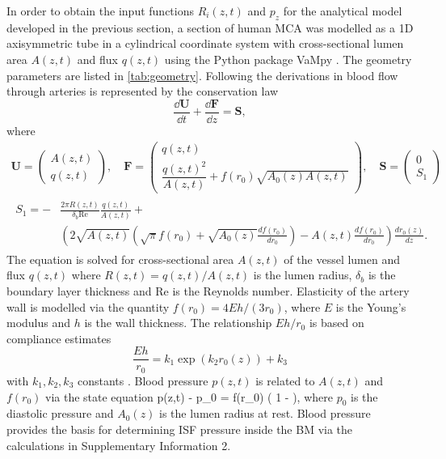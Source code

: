 \documentclass[a4paper,titlepage]{scrartcl}
\begin{document}
In order to obtain the input functions $R_i(z,t)$ and $p_z$ for the analytical model developed in the previous section, a section of human MCA was modelled as a 1D axisymmetric tube in a cylindrical coordinate system with cross-sectional lumen area $A(z,t)$ and flux $q(z,t)$ using the Python package VaMpy \cite{Diem2016a}. The geometry parameters are listed in \autoref{tab:geometry}. Following the derivations in \cite{Olufsen2000,Diem2016} blood flow through arteries is represented by the conservation law
\begin{equation}
  \frac{\dd \boldsymbol{U}}{\dd t} + \frac{\dd \boldsymbol{F}}{\dd z} = \boldsymbol{S}, \label{eq:conservation}
\end{equation}
where
\begin{gather*}
  \boldsymbol{U} = \begin{pmatrix} A(z,t) \\ q(z,t) \end{pmatrix}, \quad \boldsymbol{F} = \begin{pmatrix} q(z,t)\\ \dfrac{q(z,t)^2}{A(z,t)} + f(r_0) \sqrt{A_0(z) A(z,t)} \end{pmatrix}, \quad \boldsymbol{S} = \begin{pmatrix} 0\\ S_1 \end{pmatrix}\\
  \begin{split}
    S_1 = -&\frac{2 \pi R(z,t)}{\delta_b \mathrm{Re}} \frac{q(z,t)}{A(z,t)} +\\
    &\left( 2 \sqrt{A(z,t)} \left( \sqrt{\pi} f(r_0) + \sqrt{A_0(z)} \frac{df(r_0)}{dr_0 } \right) - A(z,t) \frac{df(r_0)}{dr_0} \right) \frac{dr_0(z)}{dz}.
  \end{split}
\end{gather*}
The equation is solved for cross-sectional area $A(z,t)$ of the vessel lumen and flux $q(z,t)$ where $R(z,t) = q(z,t)/A(z,t)$ is the lumen radius, $\delta_b$ is the boundary layer thickness and $\text{Re}$ is the Reynolds number. Elasticity of the artery wall is modelled via the quantity $f(r_0) = 4Eh/(3r_0)$, where $E$ is the Young's modulus and $h$ is the wall thickness. The relationship $Eh/r_0$ is based on compliance estimates
\begin{equation}
  \frac{Eh}{r_0} = k_1 \exp \left( k_2 r_0(z) \right) + k_3
\end{equation}
with $k_1, k_2, k_3$ constants \cite{Olufsen2000}. Blood pressure $p(z,t)$ is related to $A(z,t)$ and $f(r_0)$ via the state equation
\beq
  p(z,t) - p_0 = f(r_0) \left( 1 -  \right),
\eeq
where $p_0$ is the diastolic pressure and $A_0(z)$ is the lumen radius at rest. Blood pressure provides the basis for determining ISF pressure inside the BM via the calculations in Supplementary Information 2.
\end{document}
